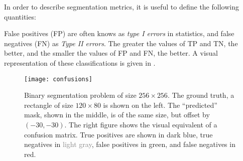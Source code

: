 In order to describe segmentation metrics, it is useful to define the following quantities:

\begin{center}
\end{center}

False positives (FP) are often knows as \textit{type I errors} in statistics, and false negatives (FN) as \textit{Type II errors}.
The greater the values of TP and TN, the better, and the smaller the values of FP and FN, the better.
A visual representation of these classifications is given in .

\begin{figure}[htb]
  \texttt{[image: confusions]}
  \caption{
    Binary segmentation problem of size $256 \times 256$.
    The ground truth, a rectangle of size $120 \times 80$ is shown on the left.
    The \enquote{predicted} mask, shown in the middle, is of the same size, but offset by $(-30, -30)$.
    The right figure shows the visual equivalent of a confusion matrix.
    True positives are shown in \textcolor{tp}{dark blue}, true negatives in \textcolor{gray}{light gray}, false positives in \textcolor{fp}{green}, and false negatives in \textcolor{fn}{red}.
  }
  \label{fig:confusions}
\end{figure}


